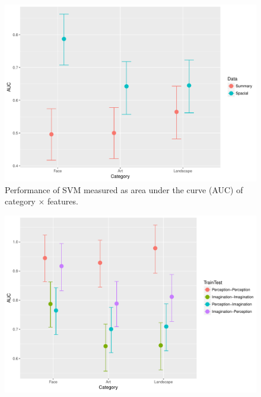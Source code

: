 \documentclass[a4paper,man,natbib,floatsintext]{apa6}
\begin{document}
\begin{figure}
\centering
\includegraphics[width=1\textwidth]{CategoryXFeature.pdf}
\caption[Category $\times$ Features]{\label{fig:CategoryXFeature} Performance of SVM measured as area under the curve (AUC) of category $\times$ features.}
\end{figure}
\begin{figure}
\centering
\includegraphics[width=1\textwidth]{CategoryXTrainTest.pdf}
\caption[Category $\times$ Training-Test-Condition]{\label{fig:CategoryXTrainTest} }
\end{figure}
\end{document}
